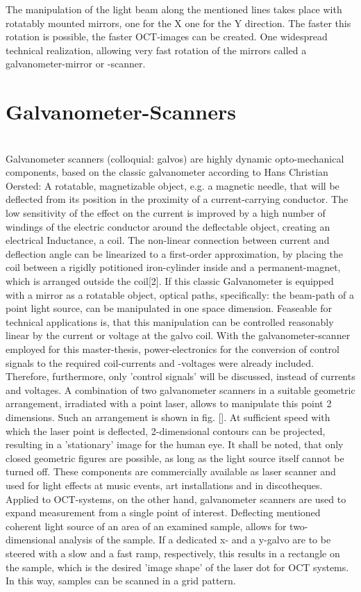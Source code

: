 The manipulation of the light beam along the mentioned lines takes place with rotatably mounted mirrors, one for the X one for the Y direction. The faster this rotation is possible, the faster OCT-images can be created. One widespread technical realization, allowing very fast rotation of the mirrors called a galvanometer-mirror or -scanner.

\section{Galvanometer-Scanners}
 \\
Galvanometer scanners (colloquial: galvos) are highly dynamic opto-mechanical components, based on the classic galvanometer according to Hans Christian Oersted: A rotatable, magnetizable object, e.g. a magnetic needle, that will be deflected from its position in the proximity of a current-carrying conductor. The low sensitivity of the effect on the current is improved by a high number of windings of the electric conductor around the deflectable object, creating an electrical Inductance, a coil. The non-linear connection between current and deflection angle can be linearized to a first-order approximation, by placing the coil between a rigidly potitioned iron-cylinder inside and a permanent-magnet, which is arranged outside the coil[2]. 
If this classic Galvanometer is equipped with a mirror as a rotatable object, optical paths, specifically: the beam-path of a point light source, can be manipulated in one space dimension. Feaseable for technical applications is, that this manipulation can be controlled reasonably linear by the current or voltage at the galvo coil. With the galvanometer-scanner employed for this master-thesis, power-electronics for the conversion of control signals to the required coil-currents and -voltages were already included. Therefore, furthermore, only 'control signals' will be discussed, instead of currents and voltages. A combination of two galvanometer scanners in a suitable geometric arrangement, irradiated with a point laser, allows to manipulate this point 2 dimensions. Such an arrangement is shown in fig. []. At sufficient speed with which the laser point is deflected, 2-dimensional contours can be projected, resulting in a 'stationary' image for the human eye. It shall be noted, that only closed geometric figures are possible, as long as the light source itself cannot be turned off. These components are commercially available as laser scanner and used for light effects at music events, art installations and in discotheques. Applied to OCT-systems, on the other hand, galvanometer scanners are used to expand measurement from a single point of interest. Deflecting mentioned coherent light source of an area of an examined sample, allows for two-dimensional analysis of the sample. If a dedicated x- and a y-galvo are to be steered with a slow and a fast ramp, respectively, this results in a rectangle on the sample, which is the desired 'image shape' of the laser dot for OCT systems. In this way, samples can be scanned in a grid pattern.

